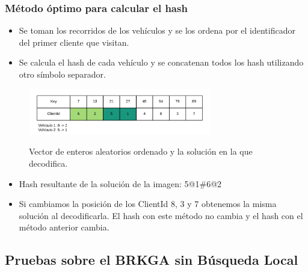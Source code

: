 \documentclass{beamer}
\begin{document}
\begin{frame}
\frametitle{Método óptimo para calcular el hash}

\begin{itemize}
    \item Se toman los recorridos de los vehículos y se los ordena por el identificador del primer cliente que visitan. 
    \pause
    \item Se calcula el hash de cada vehículo y se concatenan todos los hash utilizando otro símbolo separador.
\end{itemize}

\begin{figure}[h]
	\caption{Vector de enteros aleatorios ordenado y la solución en la que decodifica.}
	\centering
	\includegraphics[width=8cm]{DistribucionClientesDecoSimple}
	\label{fig:DistribucionClientesDecoSimple2}
\end{figure}

\begin{itemize}
    \item Hash resultante de la solución de la imagen: 5@1\#6@2
    \pause
    \item Si cambiamos la posición de los ClientId 8, 3 y 7 obtenemos la misma solución al decodificarla. El hash con este método no cambia y el hash con el método anterior cambia.
\end{itemize}

\end{frame}


\subsection{Pruebas sobre el BRKGA sin Búsqueda Local}
\end{document}

